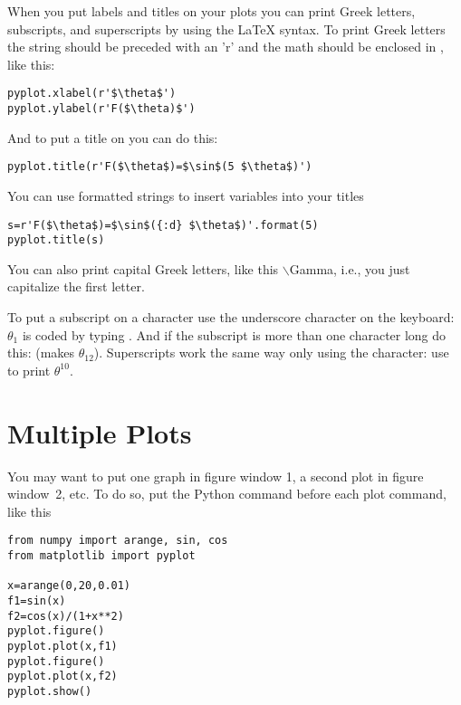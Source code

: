   When you put
labels and titles on your plots you can print Greek letters,
subscripts, and superscripts by using the LaTeX syntax. To print
Greek letters the string should be preceded with an 'r' and the math
should be enclosed in \code{\$}, like
this:
\begin{Verbatim}
pyplot.xlabel(r'$\theta$')
pyplot.ylabel(r'F($\theta)$')
\end{Verbatim}
And to put a title on you can do this:
\begin{Verbatim}
pyplot.title(r'F($\theta$)=$\sin$(5 $\theta$)')
\end{Verbatim}
You can use formatted strings to insert variables into your titles
\begin{Verbatim}
s=r'F($\theta$)=$\sin$({:d} $\theta$)'.format(5)
pyplot.title(s)
\end{Verbatim}
 
You can also print capital Greek letters, like this
$\backslash$Gamma, i.e., you just capitalize the first letter.

 To put a subscript on a character
use the underscore character on the keyboard: $\theta_1$ is coded
by typing . And if the subscript is more
than one character long do this: 
(makes $\theta_{12}$). Superscripts work the same way only using
the \code{^} character: use  to print $\theta^{10}$.

\section{Multiple Plots}

  You may want to put
one graph in figure window 1, a second plot in figure window~2,
etc. To do so, put the Python command  before each plot
command, like this
\begin{Verbatim}
from numpy import arange, sin, cos
from matplotlib import pyplot

x=arange(0,20,0.01)
f1=sin(x)
f2=cos(x)/(1+x**2)
pyplot.figure()
pyplot.plot(x,f1)
pyplot.figure()
pyplot.plot(x,f2)
pyplot.show()
\end{Verbatim}

